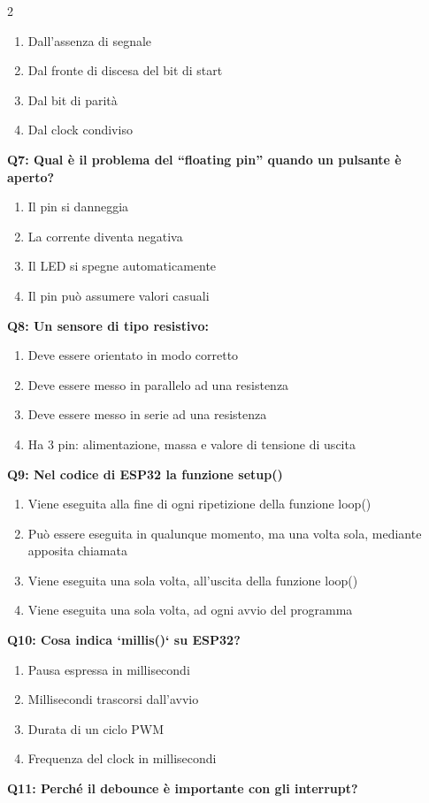 \documentclass[10pt]{article}
\begin{document}
\begin{multicols}{2}
\begin{enumerate}[label=\arabic*.]
\item Dall’assenza di segnale
\item Dal fronte di discesa del bit di start
\item Dal bit di parità
\item Dal clock condiviso
\end{enumerate}
\textbf{Q7: Qual è il problema del “floating pin” quando un pulsante è aperto?}

\begin{enumerate}[label=\arabic*.]
\item Il pin si danneggia
\item La corrente diventa negativa
\item Il LED si spegne automaticamente
\item Il pin può assumere valori casuali
\end{enumerate}
\textbf{Q8: Un sensore di tipo resistivo:}

\begin{enumerate}[label=\arabic*.]
\item Deve essere orientato in modo corretto
\item Deve essere messo in parallelo ad una resistenza
\item Deve essere messo in serie ad una resistenza
\item Ha 3 pin: alimentazione, massa e valore di tensione di uscita
\end{enumerate}
\textbf{Q9: Nel codice di ESP32 la funzione setup()}

\begin{enumerate}[label=\arabic*.]
\item Viene eseguita alla fine di ogni ripetizione della funzione loop()
\item Può essere eseguita in qualunque momento, ma una volta sola, mediante apposita chiamata
\item Viene eseguita una sola volta, all'uscita della funzione loop()
\item Viene eseguita una sola volta, ad ogni avvio del programma
\end{enumerate}
\textbf{Q10: Cosa indica `millis()` su ESP32?}

\begin{enumerate}[label=\arabic*.]
\item Pausa espressa in millisecondi
\item Millisecondi trascorsi dall'avvio
\item Durata di un ciclo PWM
\item Frequenza del clock in millisecondi
\end{enumerate}
\textbf{Q11: Perché il debounce è importante con gli interrupt?}


\end{multicols}
\end{document}
